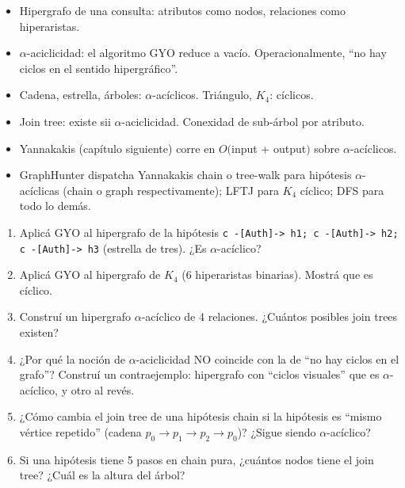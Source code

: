 \begin{itemize}
    \item Hipergrafo de una consulta: atributos como nodos,
    relaciones como hiperaristas.
    \item \(\alpha\)-aciclicidad: el algoritmo GYO reduce a vacío.
    Operacionalmente, ``no hay ciclos en el sentido hipergráfico''.
    \item Cadena, estrella, árboles: \(\alpha\)-acíclicos. Triángulo,
    \(K_4\): cíclicos.
    \item Join tree: existe sii \(\alpha\)-aciclicidad. Conexidad
    de sub-árbol por atributo.
    \item Yannakakis (capítulo siguiente) corre en \(O(\)input +
    output\()\) sobre \(\alpha\)-acíclicos.
    \item GraphHunter dispatcha Yannakakis chain o tree-walk para
    hipótesis \(\alpha\)-acíclicas (chain o graph respectivamente);
    LFTJ para \(K_4\) cíclico; DFS para todo lo demás.
\end{itemize}

\begin{ejercicios}
\begin{enumerate}
    \item \starred{} Aplicá GYO al hipergrafo de la hipótesis
    \texttt{c -[Auth]-> h1; c -[Auth]-> h2; c -[Auth]-> h3}
    (estrella de tres). ¿Es \(\alpha\)-acíclico?

    \item Aplicá GYO al hipergrafo de \(K_4\) (6 hiperaristas
    binarias). Mostrá que es cíclico.

    \item \starred{} Construí un hipergrafo \(\alpha\)-acíclico
    de 4 relaciones. ¿Cuántos posibles join trees existen?

    \item ¿Por qué la noción de \(\alpha\)-aciclicidad NO
    coincide con la de ``no hay ciclos en el grafo''? Construí un
    contraejemplo: hipergrafo con ``ciclos visuales'' que es
    \(\alpha\)-acíclico, y otro al revés.

    \item ¿Cómo cambia el join tree de una hipótesis chain si la
    hipótesis es ``mismo vértice repetido'' (cadena
    \(p_0 \to p_1 \to p_2 \to p_0\))? ¿Sigue siendo \(\alpha\)-acíclico?

    \item Si una hipótesis tiene 5 pasos en chain pura, ¿cuántos
    nodos tiene el join tree? ¿Cuál es la altura del árbol?
\end{enumerate}
\end{ejercicios}
